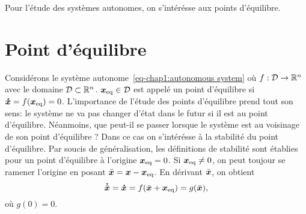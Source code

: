Pour l'étude des systèmes autonomes, on s'intérésse aux points d'équilibre.


\section{Point d'équilibre}
Considérons le système autonome~\eqref{eq-chap1:autonomous system} où $f:{\cal D}\rightarrow\mathbb{R}^n$ avec le domaine ${\cal D}\subset\mathbb{R}^n$. $\bm{x}_{\rm eq}\in{\cal D}$ est appelé un point d'équilibre si $\bm{\dot{x}}=f(\bm{x}_{\rm eq})=0$. L'importance de l'étude des points d'équilibre prend tout son sens: le système ne va pas changer d'état dans le futur si il est au point d'équilibre. Néanmoins, que peut-il se passer lorsque le système est au voisinage de son point d'équilibre ? Dans ce cas on s'intérésse à la stabilité du point d'équilibre. Par soucis de généralisation, les définitions de stabilité sont établies pour un point d'équilibre à l'origine $\bm{x}_{\rm eq}=0$.  Si $\bm{x}_{\rm eq}\neq0$, on peut toujour se ramener l'origine en  posant $\bar{\bm{x}} = \bm{x} - \bm{x}_{\rm eq}$. En dérivant $\bar{\bm{x}}$, on obtient
\begin{equation}
	\bm\dot{\bar{\bm{x}}} = \bm{\dot{x}} = f(\bar{\bm{x}}+\bm{x}_{\rm eq}) =g(\bar{\bm{x}}),  
\end{equation} 
où $g(0)=0$.
